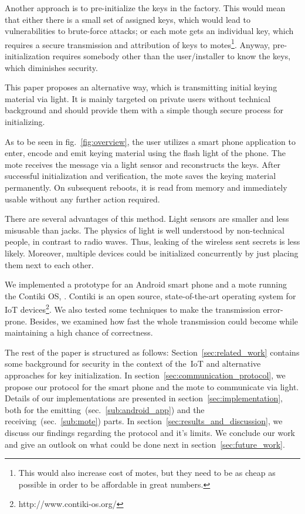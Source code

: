\documentclass{sig-alternate} %
\begin{document}
Another approach is to pre-initialize the keys in the factory.
This would mean that either there is a small set of assigned keys, which would lead to vulnerabilities to brute-force attacks; or each mote gets an individual key, which requires a secure transmission and attribution of keys to motes\footnote{This would also increase cost of motes, but they need to be as cheap as possible in order to be affordable in great numbers.}.
Anyway, pre-initialization requires somebody other than the user/installer to know the keys, which diminishes security.

This paper proposes an alternative way, which is transmitting initial keying material via light.
It is mainly targeted on private users without technical background and should provide them with a simple though secure process for initializing.

As to be seen in fig.~\ref{fig:overview}, the user utilizes a smart phone application to enter, encode and emit keying material using the flash light of the phone.
The mote receives the message via a light sensor and reconstructs the keys.
After successful initialization and verification, the mote saves the keying material permanently.
On subsequent reboots, it is read from memory and immediately usable without any further action required.

There are several advantages of this method.
Light sensors are smaller and less misusable than jacks.
The physics of light is well understood by non-technical people, in contrast to radio waves.
Thus, leaking of the wireless sent secrets is less likely.
Moreover, multiple devices could be initialized concurrently by just placing them next to each other.

We implemented a prototype for an Android smart phone and a mote running the Contiki OS, \cite{dunkels04contiki}.
Contiki is an open source, state-of-the-art operating system for IoT devices\footnote{http://www.contiki-os.org/}.
We also tested some techniques to make the transmission error-prone.
Besides, we examined how fast the whole transmission could become while maintaining a high chance of correctness.

The rest of the paper is structured as follows:
Section~\ref{sec:related_work} contains some background for security in the context of the~IoT and alternative approaches for key initialization.
In section~\ref{sec:communication_protocol}, we propose our protocol for the smart phone and the mote to communicate via light.
Details of our implementations are presented in section~\ref{sec:implementation}, both for the emitting~(sec.~\ref{sub:android_app}) and the receiving~(sec.~\ref{sub:mote}) parts.
In section~\ref{sec:results_and_discussion}, we discuss our findings regarding the protocol and it's limits.
We conclude our work and give an outlook on what could be done next in section~\ref{sec:future_work}.
\end{document}
